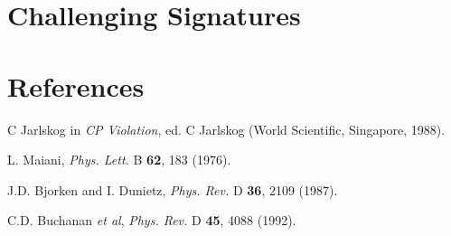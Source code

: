 \documentclass{moriond}
\def\Journal#1#2#3#4{{#1} {\bf #2}, #3 (#4)}
\def\PLB{{\em Phys. Lett.}  B}
\def\PRD{{\em Phys. Rev.} D}
\begin{document}
\section{Challenging Signatures}

\section*{References}

\begin{thebibliography}{99}
C Jarlskog in {\em CP Violation}, ed. C Jarlskog
(World Scientific, Singapore, 1988).

L. Maiani, \Journal{\PLB}{62}{183}{1976}.

J.D. Bjorken and I. Dunietz, \Journal{\PRD}{36}{2109}{1987}.

C.D. Buchanan {\it et al}, \Journal{\PRD}{45}{4088}{1992}.

\end{thebibliography}
\end{document}
